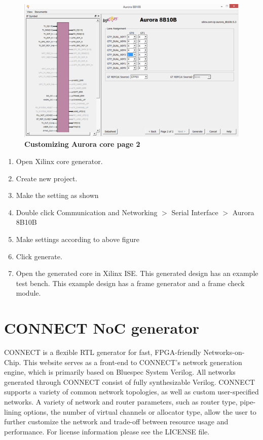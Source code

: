 \begin{appendix}
\begin{figure}[H]
  \centering
   \includegraphics[scale=0.8]{./figs/auroraIP3}
  \caption{\textbf{Customizing Aurora core page 2}}
  \label{auroraIP3}
\end{figure}

\begin{enumerate}
	\item{Open Xilinx core generator.}
	\item{Create new project.}
	\item{Make the setting as shown}
	\item{Double click Communication and Networking $>$ Serial Interface $>$ Aurora 8B10B}
	\item{Make settings according to above figure}
	\item{Click generate.}
	\item{Open the generated core in Xilinx ISE. This generated design has an example test bench. This example design has a frame generator and a frame check module.}
\end{enumerate}

\section {CONNECT NoC generator}
\label{CONNECT}
CONNECT is a flexible RTL generator for fast, FPGA-friendly Networks-on-Chip. This website serves as a front-end to CONNECT's network generation engine, which is primarily based on Bluespec System Verilog. All networks generated through CONNECT consist of fully synthesizable Verilog.  CONNECT supports a variety of common network topologies, as well as custom user-specified networks. A variety of network and router parameters, such as router type, pipe-lining options, the number of virtual channels or allocator type,  allow the user to further customize the network and trade-off between resource  usage and performance.  For license information please see the LICENSE file.


\end{appendix}
